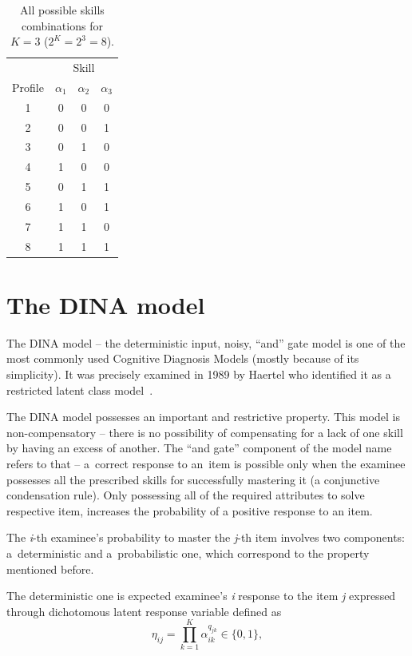 \documentclass[english]{pwr_wmat_praca_dyplomowa}
\theoremstyle{plain}
\theoremstyle{definition}
\numberwithin{theorem}{chapter}
\begin{document}
\begin{table}[H]
	\centering
	\begin{tabular}{c c c c} 
		\hline
		{\rule{0pt}{3ex}} & \multicolumn{3}{c}{Skill} \\
		Profile & $\alpha_1$ & $\alpha_2$ & $\alpha_3$ \\ [0.5ex] 
		\hline
		1 & 0 & 0 & 0 \\ 
		2 & 0 & 0 & 1 \\
		3 & 0 & 1 & 0 \\
		4 & 1 & 0 & 0 \\
		5 & 0 & 1 & 1 \\
		6 & 1 & 0 & 1 \\ 
		7 & 1 & 1 & 0 \\
		8 & 1 & 1 & 1\\[1ex] 
		\hline
	\end{tabular}
	\caption{All possible skills combinations for $K=3$ ($2^K = 2^3 = 8$).}
	\label{tab:skillprofile} 
\end{table}

\section{The DINA model}

The DINA model -- the deterministic input, noisy, ``and'' gate model is one of the most commonly used Cognitive Diagnosis Models (mostly because of its simplicity). It was precisely examined in 1989 by Haertel who identified it as a restricted latent class model~\cite{dina_model}. 

The DINA model possesses an important and restrictive property. This model is non-compensatory -- there is no possibility of compensating for a lack of one skill by having an excess of another. The ``and gate'' component of the model name refers to that -- a~correct response to an~item is possible only when the examinee possesses all the prescribed skills for successfully mastering it (a conjunctive condensation rule). Only possessing all of the required attributes to solve respective item, increases the probability of a positive response to an item. 

The \textit{i}-th examinee's probability to master the \textit{j}-th item involves two components: a~deterministic and a~probabilistic one, which correspond to the property mentioned before.

The deterministic one is expected examinee's \textit{i} response to the item \textit{j} expressed through dichotomous latent response variable defined as
\begin{equation}
\eta_{ij} = \prod\limits_{k=1}^{K} \alpha_{ik}^{q_{jk}} \in \{0,1\},
\end{equation}
\end{document}
